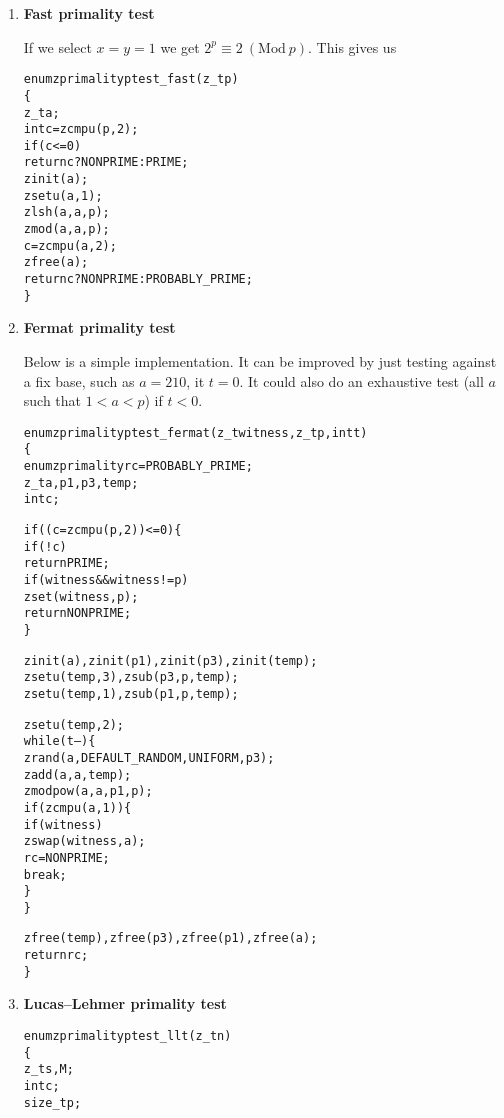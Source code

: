 \begin{enumerate}[label=\textbf{\arabic*}.]
\item \textbf{Fast primality test}

If we select $x = y = 1$ we get
$2^p \equiv 2 ~(\text{Mod}~p)$. This gives us

\vspace{-1em}
\begin{alltt}
enum zprimality ptest_fast(z_t p)
\{
    z_t a;
    int c = zcmpu(p, 2);
    if (c <= 0)
        return c ? NONPRIME : PRIME;
    zinit(a);
    zsetu(a, 1);
    zlsh(a, a, p);
    zmod(a, a, p);
    c = zcmpu(a, 2);
    zfree(a);
    return c ? NONPRIME : PROBABLY_PRIME;
\}
\end{alltt}



\item \textbf{Fermat primality test}

Below is a simple implementation. It can be improved by
just testing against a fix base, such as $a = 210$, it
$t = 0$. It could also do an exhaustive test (all $a$
such that $1 < a < p$) if $t < 0$.

\vspace{-1em}
\begin{alltt}
enum zprimality ptest_fermat(z_t witness, z_t p, int t)
\{
    enum zprimality rc = PROBABLY_PRIME;
    z_t a, p1, p3, temp;
    int c;

    if ((c = zcmpu(p, 2)) <= 0) \{
        if (!c)
            return PRIME;
        if (witness && witness != p)
            zset(witness, p);
        return NONPRIME;
    \}

    zinit(a), zinit(p1), zinit(p3), zinit(temp);
    zsetu(temp, 3), zsub(p3, p, temp);
    zsetu(temp, 1), zsub(p1, p, temp);

    zsetu(temp, 2);
    while (t--) \{
        zrand(a, DEFAULT_RANDOM, UNIFORM, p3);
        zadd(a, a, temp);
        zmodpow(a, a, p1, p);
        if (zcmpu(a, 1)) \{
            if (witness)
                zswap(witness, a);
            rc = NONPRIME;
            break;
        \}
    \}

    zfree(temp), zfree(p3), zfree(p1), zfree(a);
    return rc;
\}
\end{alltt}



\item \textbf{Lucas–Lehmer primality test}

\vspace{-1em}
\begin{alltt}
enum zprimality ptest_llt(z_t n)
\{
    z_t s, M;
    int c;
    size_t p;


\end{alltt}
\end{enumerate}
